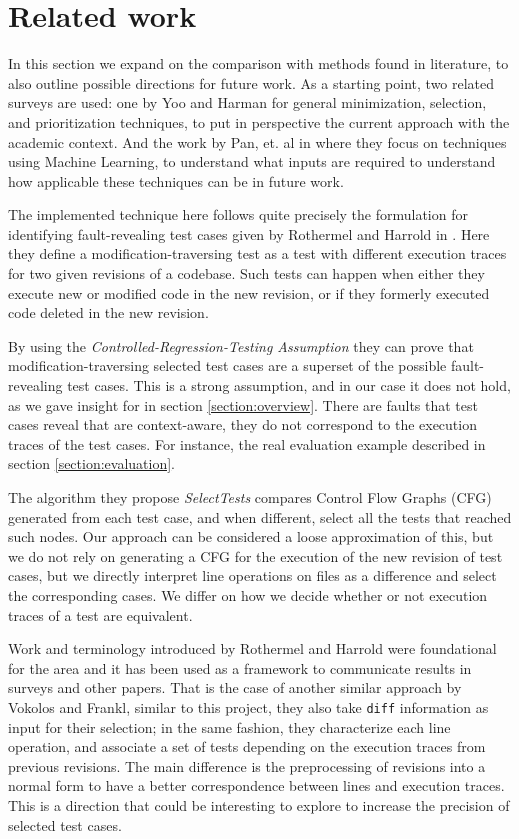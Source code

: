 \documentclass{article}
\begin{document}
\section{Related work}\label{section:alg-and-context}

In this section we expand on the comparison with methods found in literature, to also outline possible directions for future work. As a starting point, two related surveys are used: one by Yoo and Harman \cite{Yoo2009RegressionTM} for general minimization, selection, and prioritization techniques, to put in perspective the current approach with the academic context. And the work by Pan, et. al in \cite{Pan2021TestCS} where they focus on techniques using Machine Learning, to understand what inputs are required to understand how applicable these techniques can be in future work.

The implemented technique here follows quite precisely the formulation for identifying fault-revealing test cases given by Rothermel and Harrold in \cite{Rothermel1997ASE}. Here they define a modification-traversing test as a test with different execution traces for two given revisions of a codebase. Such tests can happen when either they execute new or modified code in the new revision, or if they formerly executed code deleted in the new revision.

By using the \emph{Controlled-Regression-Testing Assumption} they can prove that modification-traversing selected test cases are a superset of the possible fault-revealing test cases. This is a strong assumption, and in our case it does not hold, as we gave insight for in section \ref{section:overview}. There are faults that test cases reveal that are context-aware, they do not correspond to the execution traces of the test cases. For instance, the real evaluation example described in section \ref{section:evaluation}.

The algorithm they propose \emph{SelectTests} compares Control Flow Graphs (CFG) generated from each test case, and when different, select all the tests that reached such nodes. Our approach can be considered a loose approximation of this, but we do not rely on generating a CFG for the execution of the new revision of test cases, but we directly interpret line operations on files as a difference and select the corresponding cases. We differ on how we decide whether or not execution traces of a test are equivalent.

Work and terminology introduced by Rothermel and Harrold \cite{Rothermel1997ASE} were foundational for the area and it has been used as a framework to communicate results in surveys and other papers. That is the case of another similar approach by Vokolos and Frankl\cite{Vokolos97pythia}, similar to this project, they also take \texttt{diff} information as input for their selection; in the same fashion, they characterize each line operation, and associate a set of tests depending on the execution traces from previous revisions. The main difference is the preprocessing of revisions into a normal form to have a better correspondence between lines and execution traces. This is a direction that could be interesting to explore to increase the precision of selected test cases.
\end{document}
